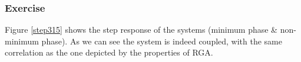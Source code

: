 \subsubsection{Exercise}

Figure \ref{step315} shows the step response of the systems (minimum phase \& non-minimum phase). 
As we can see the system is indeed coupled, with the same correlation as the one depicted by the properties of RGA.
